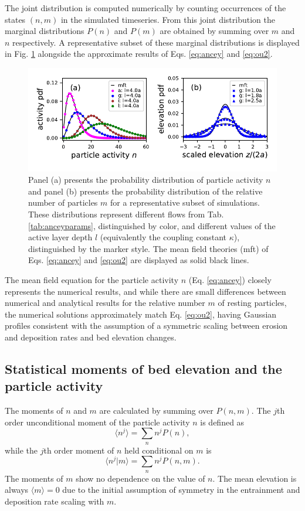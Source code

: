 The joint distribution is computed numerically by counting occurrences of the states $(n,m)$ in the simulated timeseries.
From this joint distribution the marginal distributions $P(n)$ and $P(m)$ are obtained by summing over $m$ and $n$ respectively.
A representative subset of these marginal distributions is displayed in Fig. \ref{fig:pdfs} alongside the approximate results of Eqs. \ref{eq:ancey} and \ref{eq:ou2}.
\begin{figure}[!htbp]
	\includegraphics[width=\linewidth,keepaspectratio]{./figures/ch3/distributions.pdf}
	\caption{Panel (a) presents the probability distribution of particle activity $n$ and panel (b) presents the probability distribution of the relative number of particles $m$ for a representative subset of simulations. These distributions represent different flows from Tab. \ref{tab:anceyparams}, distinguished by color, and different values of the active layer depth $l$ (equivalently the coupling constant $\kappa$), distinguished by the marker style. The mean field theories (mft) of Eqs. \ref{eq:ancey} and \ref{eq:ou2} are displayed as solid black lines.}
	\label{fig:pdfs}
\end{figure}
The mean field equation for the particle activity $n$ (Eq.  \ref{eq:ancey}) closely represents the numerical results, and while there are small differences between numerical and analytical results for the relative number $m$ of resting particles, the numerical solutions approximately match Eq. \ref{eq:ou2}, having Gaussian profiles consistent with the assumption of a symmetric scaling between erosion and deposition rates and bed elevation changes. 


\subsection{Statistical moments of bed elevation and the particle activity}
\label{sec:elemom}

The moments of $n$ and $m$ are calculated by summing over $P(n,m)$. 
The $j$th order unconditional moment of the particle activity $n$ is defined as
\begin{equation} \langle n^j \rangle = \sum_{n}n^jP(n),\end{equation}
while the $j$th order moment of $n$ held conditional on $m$ is
\begin{equation} \langle n^j|m \rangle = \sum_{n}n^j P(n,m) .\end{equation}
The moments of $m$ show no dependence on the value of $n$. 
The mean elevation is always $\langle m \rangle = 0 $ due to the initial assumption of symmetry in the entrainment and deposition rate scaling with $m$. 


